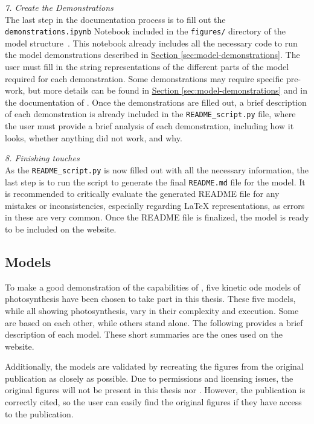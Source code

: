 \emph{7. Create the Demonstrations}\\
The last step in the documentation process is to fill out the \verb|demonstrations.ipynb| Notebook included in the \verb|figures/| directory of the model structure~. This notebook already includes all the necessary code to run the model demonstrations described in \hyperref[sec:model-demonstrations]{Section \ref*{sec:model-demonstrations}}. The user must fill in the string representations of the different parts of the model required for each demonstration. Some demonstrations may require specific pre-work, but more details can be found in \hyperref[sec:model-demonstrations]{Section \ref*{sec:model-demonstrations}} and in the documentation of \greensloth[GreenSlothUtils]. Once the demonstrations are filled out, a brief description of each demonstration is already included in the \verb|README_script.py| file, where the user must provide a brief analysis of each demonstration, including how it looks, whether anything did not work, and why.

\emph{8. Finishing touches}\\
As the \verb|README_script.py| is now filled out with all the necessary information, the last step is to run the script to generate the final \verb|README.md| file for the model. It is recommended to critically evaluate the generated README file for any mistakes or inconsistencies, especially regarding \LaTeX{} representations, as errors in these are very common. Once the README file is finalized, the model is ready to be included on the \greensloth{} website.

\subsection{Models}

To make a good demonstration of the capabilities of \greensloth{}, five kinetic \gls{ode} models of photosynthesis have been chosen to take part in this thesis. These five models, while all showing photosynthesis, vary in their complexity and execution. Some are based on each other, while others stand alone. The following provides a brief description of each model. These short summaries are the ones used on the \greensloth{} website.

Additionally, the models are validated by recreating the figures from the original publication as closely as possible. Due to permissions and licensing issues, the original figures will not be present in this thesis nor \greensloth{}. However, the publication is correctly cited, so the user can easily find the original figures if they have access to the publication.

